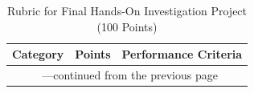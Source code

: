 \documentclass[12pt,letterpaper]{article}
\begin{document}
\begin{longtable}{|p{}|p{}|p{}|}
    \caption{Rubric for Final Hands-On Investigation Project (100 Points)}
    \label{tab:rubric}                                                                                                                                                                                                                                                                                                                                                                                                                                                                                                                                                                                                                                                                                                                                                                                                         \\
    \hline
    \textbf{Category}                            & \textbf{Points} & \textbf{Performance Criteria}                                                                                                                                                                                                                                                                                                                                                                                                                                                                                                                                                                                                                                                                                                                             \\
    \hline
    \endfirsthead
    \multicolumn{3}{c}{\tablename\ \thetable{}---continued from the previous page}                                                                                                                                                                                                                                                                                                                                                                                                                                                                                                                                                                                                                                                                                                                                             \\

\end{longtable}
\end{document}
